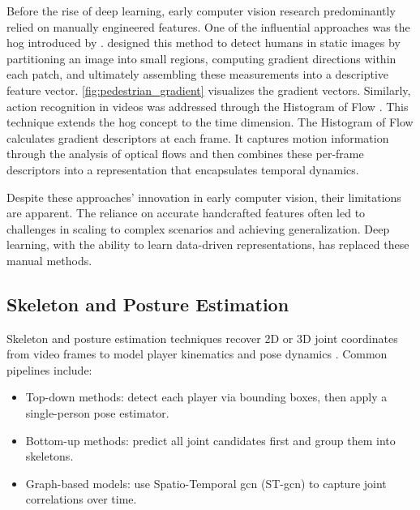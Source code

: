 Before the rise of deep learning, early computer vision research predominantly relied on manually engineered features. One of the influential approaches was the \acrfull{hog} introduced by \textcite{dalal_histogram_of_gradients}. \textcite{dalal_histogram_of_gradients} designed this method to detect humans in static images by partitioning an image into small regions, computing gradient directions within each patch, and ultimately assembling these measurements into a descriptive feature vector. \cref{fig:pedestrian_gradient} visualizes the gradient vectors. Similarly, action recognition in videos was addressed through the Histogram of Flow \cite{dalal_histogram_of_flow}. This technique extends the \acrshort{hog} concept to the time dimension. The Histogram of Flow calculates gradient descriptors at each frame. It captures motion information through the analysis of optical flows and then combines these per-frame descriptors into a representation that encapsulates temporal dynamics. 

Despite these approaches' innovation in early computer vision, their limitations are apparent. The reliance on accurate handcrafted features often led to challenges in scaling to complex scenarios and achieving generalization. Deep learning, with the ability to learn data-driven representations, has replaced these manual methods.

\subsection{Skeleton and Posture Estimation}
\label{ssec:skeleton_posture_estimation}

Skeleton and posture estimation techniques recover 2D or 3D joint coordinates from video frames to model player kinematics and pose dynamics \cite{elaoud_skeleton-based_2020, wang_skeleton_two-stream_2023, reilly__skeleton_just_pi_2023}. Common pipelines include:

\begin{itemize}
    \item Top-down methods: detect each player via bounding boxes, then apply a single-person pose estimator.
    \item Bottom-up methods: predict all joint candidates first and group them into skeletons.
    \item Graph-based models: use Spatio-Temporal \acrlong{gcn} (ST-\acrshort{gcn}) to capture joint correlations over time\cite{yan_spatial_temporal_graph_convolutional_2018}.
\end{itemize}

